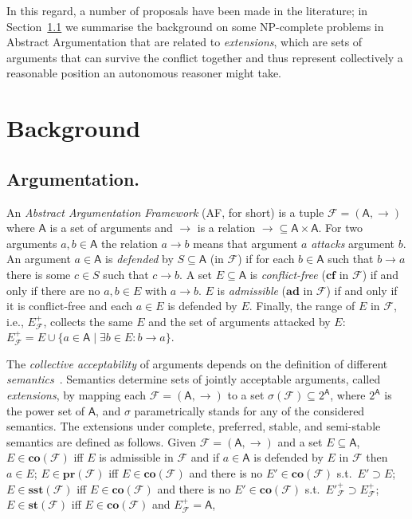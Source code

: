 \documentclass[conference]{IEEEtran}
\newcommand{\powerset}[1]{\ensuremath{2^{#1}}} %
\newcommand{\AF}{\ensuremath{\mathcal{F}}\xspace} %
\newcommand{\F}{\ensuremath{\mathcal{F}}\xspace} %
\newcommand{\args}{\ensuremath{\mathsf{A}}\xspace} %
\newcommand{\atts}{\ensuremath{\rightarrow}\xspace}
\newcommand{\attackers}[2]{\ensuremath{\mathcal{F}_{#1}(#2)\xspace}} %
\newcommand{\AFC}{\ensuremath{\AF=(\args,\atts)}\xspace} %
\newcommand{\cA}{\ensuremath{\mathcal{A}}} %
\newcommand{\cB}{\ensuremath{\mathcal{B}}} %
\newcommand{\cC}{\ensuremath{\mathcal{C}}} %
\newcommand{\af}{AF}
\newcommand{\cf}{\mathbf{cf}}
\newcommand{\ad}{\mathbf{ad}}
\newcommand{\co}{\mathbf{co}}
\newcommand{\pr}{\mathbf{pr}}
\newcommand{\st}{\mathbf{st}}
\newcommand{\sst}{\mathbf{sst}}
\begin{document}
In this regard, a number of proposals have been made in the literature; in Section~\ref{sect:bgarg} we summarise the background on  some NP-complete problems in Abstract Argumentation that are related to \emph{extensions}, which are sets of arguments that can survive the conflict together and thus represent collectively a reasonable position an autonomous reasoner might take. 


\section{Background}\label{sect:background}


\subsection{Argumentation.}\label{sect:bgarg} An \emph{Abstract Argumentation Framework} (\af, for short) \cite{Dung:1995}
is a tuple $\F=(\args,\atts)$ where
\args is a set of arguments and
\atts is a relation $\atts\subseteq \args\times\args$.
For two arguments $a,b\in\args$ the relation $a \atts b$ means that argument $a$ \emph{attacks} argument $b$.
An argument $a \in \args$ is \emph{defended} by $S \subseteq \args$ (in $\F$)
if for each $b \in \args$ such that $b \atts a$
there is some $c \in S$ such that $c \atts b$.
A set $E \subseteq \args$ is \emph{conflict-free} ($\cf$ in \F) if and only if there are no $a,b\in E$ with $a \atts b$.
$E$ is \emph{admissible} ($\ad$ in \F) if and only if it is conflict-free and each $a \in E$ is defended by $E$.
Finally, the range of $E$ in $\F$, i.e., $E^{+}_\F$, collects the same $E$ and the set of arguments attacked by $E$: $E^{+}_\F=E \cup \{a\in\args \mid \exists b\in E: b \atts a\}$.


The \emph{collective acceptability} of  arguments depends on the definition of
different \textit{semantics}~\cite{Dung:1995}.  Semantics determine
sets of jointly acceptable arguments, called \emph{extensions}, by
mapping each \AFC to a set $\sigma(\F) \subseteq \powerset{\args}$, where $\powerset{\args}$ is the  power set of $\args$, and $\sigma$ parametrically stands for any of the considered semantics.
The extensions under complete, preferred, stable,  and semi-stable
semantics are defined as follows.
Given \AFC and a set $E \subseteq \args$, $E \in \co(\F)$ iff $E$ is admissible in $\F$ and if $a \in \args$ is defended by $E$ in $\F$ then $a\in E$;  $E \in \pr(\F)$ iff $E \in \co(\F)$ and there is no $E' \in \co(\F)$ s.t.\ $E' \supset E$; $E \in \sst(\F)$ iff $E \in \co(\F)$ and there is no $E' \in \co(\F)$ s.t.\ $E'^+_\F \supset E^+_\F$; $E \in \st(\F)$ iff $E \in \co(\F)$ and $E^+_\F = \args$,
\end{document}
